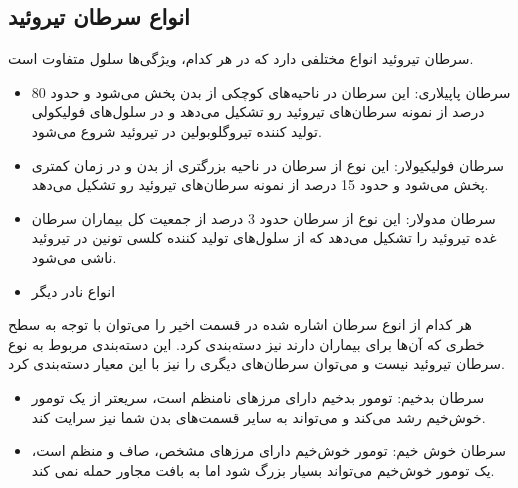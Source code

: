 \subsection{انواع سرطان تیروئید}\label{subsec:انواع-سرطان-تیروئید}

سرطان تیروئید انواع مختلفی دارد که در هر کدام، ویژگی‌ها سلول متفاوت است.

\begin{itemize}
    \item سرطان پاپیلاری:
    این سرطان در ناحیه‌های کوچکی از بدن پخش می‌شود و حدود 80 درصد از نمونه سرطان‌های تیروئید رو تشکیل می‌دهد و در سلول‌های فولیکولی تولید کننده تیروگلوبولین در تیروئید شروع می‌شود.
    \item سرطان فولیکیولار:
    این نوع از سرطان در ناحیه بزرگتری از بدن و در زمان کمتری پخش می‌شود و حدود 15 درصد از نمونه سرطان‌های تیروئید رو تشکیل می‌دهد.
    \item سرطان مدولار:
    این نوع از سرطان حدود 3 درصد از جمعیت کل بیماران سرطان غده تیروئید را تشکیل می‌دهد که از سلول‌های تولید کننده کلسی تونین در تیروئید ناشی می‌شود.
    \item انواع نادر دیگر
\end{itemize}

هر کدام از انوع سرطان اشاره شده در قسمت اخیر را می‌توان با توجه به سطح خطری که آن‌ها برای بیماران دارند نیز دسته‌بندی کرد.
این دسته‌بندی مربوط به نوع سرطان تیروئید نیست و می‌توان سرطان‌های دیگری را نیز با این معیار دسته‌بندی کرد.
\begin{itemize}
    \item سرطان بدخیم:
    تومور بدخیم دارای مرزهای نامنظم است، سریعتر از یک تومور خوش‌خیم رشد می‌کند و می‌تواند به سایر قسمت‌های بدن شما نیز سرایت کند.
    \item سرطان خوش خیم:
    تومور خوش‌خیم دارای مرزهای مشخص، صاف و منظم است، یک تومور خوش‌خیم می‌تواند بسیار بزرگ شود اما به بافت مجاور حمله نمی کند.
\end{itemize}